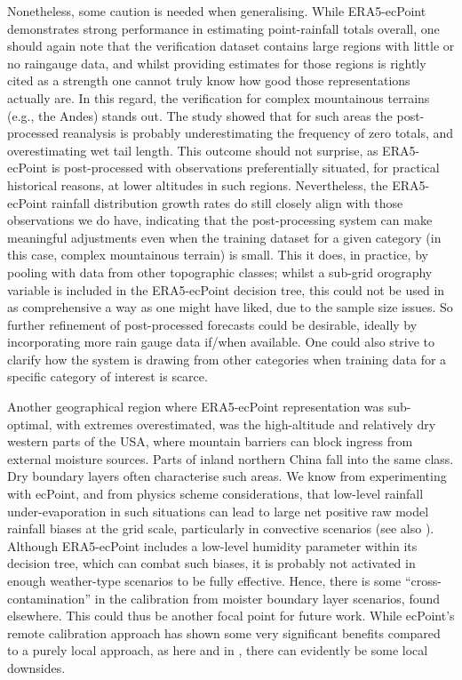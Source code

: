 \documentclass{ametsocV6.1}
\begin{document}
Nonetheless, some caution is needed when generalising. While ERA5-ecPoint demonstrates strong performance in estimating point-rainfall totals overall, one should again note that the verification dataset contains large regions with little or no raingauge data, and whilst providing estimates for those regions is rightly cited as a strength one cannot truly know how good those representations actually are. In this regard, the verification for complex mountainous terrains (e.g., the Andes) stands out. The study showed that for such areas the post-processed reanalysis is probably underestimating the frequency of zero totals, and  overestimating wet tail length. This outcome should not surprise, as ERA5-ecPoint is post-processed with observations preferentially situated, for practical historical reasons, at lower altitudes in such regions. Nevertheless, the ERA5-ecPoint rainfall distribution growth rates do still closely align with those observations we do have, indicating that the post-processing system can make meaningful adjustments even when the training dataset for a given category (in this case, complex mountainous terrain) is small. This it does, in practice, by pooling with data from other topographic classes; whilst a sub-grid orography variable is included in the ERA5-ecPoint decision tree, this could not be used in as comprehensive a way as one might have liked, due to the sample size issues. So further refinement of post-processed forecasts could be desirable, ideally by incorporating more rain gauge data if/when available. One could also strive to clarify how the system is drawing from other categories when training data for a specific category of interest is scarce.

Another geographical region where ERA5-ecPoint representation was sub-optimal, with extremes overestimated, was the high-altitude and relatively dry western parts of the USA, where mountain barriers can block ingress from external moisture sources. Parts of inland northern China fall into the same class. Dry boundary layers often characterise such areas. We know from experimenting with ecPoint, and from physics scheme considerations, that low-level rainfall under-evaporation in such situations can lead to large net positive raw model rainfall biases at the grid scale, particularly in convective scenarios (see also \cite{Gascon2025}). Although ERA5-ecPoint includes a low-level humidity parameter within its decision tree, which can combat such biases, it is probably not activated in enough weather-type scenarios to be fully effective. Hence, there is some ``cross-contamination'' in the calibration from moister boundary layer scenarios, found elsewhere. This could thus be another focal point for future work. While ecPoint's remote calibration approach has shown some very significant benefits compared to a purely local approach, as here and in \cite{HewsonPillosu2021}, there can evidently be some local downsides.
\end{document}
